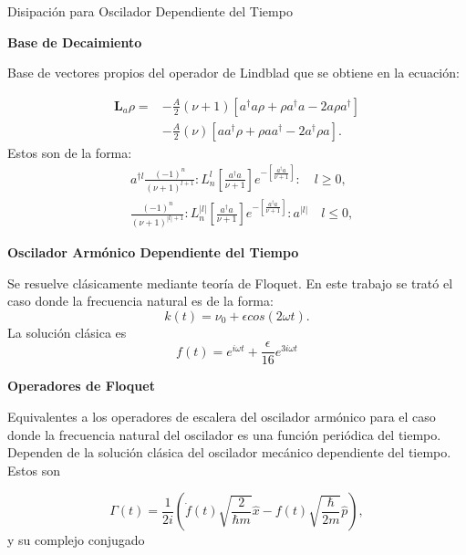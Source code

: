 \documentclass[11pt]{beamer}
\begin{document}
\begin{frame}{Disipación para Oscilador Dependiente del Tiempo}

\textbf{Base de Decaimiento}

Base de vectores propios del operador de Lindblad que se obtiene en la ecuación:

\begin{align}\label{OsciladorLindblad}
\textbf{L}_a \rho =& - \frac{A}{2}(\nu + 1)[a^\dagger a\rho + \rho a^\dagger a -2a\rho a^\dagger] \nonumber \\
 &- \frac{A}{2}(\nu)[ aa^\dagger\rho + \rho  aa^\dagger -2a^\dagger\rho a].
\end{align} Estos son de la forma:
\begin{align}\label{DampingBasis}
&a^{\dagger l}\frac{(-1)^n}{(\nu+1)^{l+1}}:L_n^l[\frac{a^\dagger a}{\nu+1}]e^{-[\frac{a^\dagger a}{\nu+1}]}:\quad l \geq 0, \\
&\frac{(-1)^n}{(\nu+1)^{|l|+1}}:L_n^{|l|}[\frac{a^\dagger a}{\nu+1}]e^{-[\frac{a^\dagger a}{\nu+1}]}:a^{|l|}\quad l \leq 0,
\end{align}
\end{frame}

\begin{frame}
\textbf{Oscilador Armónico Dependiente del Tiempo}

Se resuelve clásicamente mediante teoría de Floquet\cite{WardFT}. En este trabajo se trató el caso donde la frecuencia natural es de la forma:
\begin{equation}
k(t) = \nu_0 + \epsilon cos(2\omega t).
\end{equation} La solución clásica es
\begin{equation}
f(t)= e^{i\omega t} + \frac{\epsilon}{16} e^{3i\omega t}
\end{equation}

\end{frame}


\begin{frame}
\textbf{Operadores de Floquet}

Equivalentes a los operadores de escalera del oscilador armónico para el caso donde la frecuencia natural del oscilador es una función periódica del tiempo. Dependen de la solución clásica del oscilador mecánico dependiente del tiempo. Estos son

\begin{equation}
\Gamma(t) = \frac{1}{2i}(\dot{f}(t)\sqrt{\frac{2}{\hbar m}}\hat{x}-f(t)\sqrt{\frac{\hbar}{2m}}\hat{p}),
\end{equation} y su complejo conjugado

\end{frame}
\end{document}
